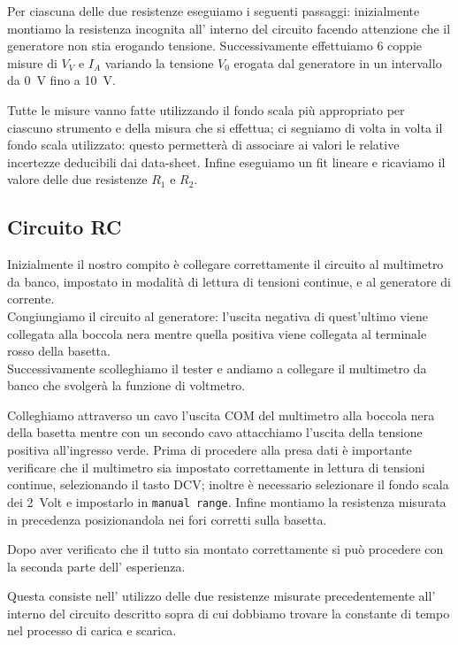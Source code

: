 \documentclass[italian, a4paper, 10pt, twocolumn]{../../style/lab_unige}
\begin{document}
    Per ciascuna delle due resistenze eseguiamo i seguenti passaggi: inizialmente montiamo la resistenza incognita  all’ interno del circuito facendo attenzione che il generatore non stia erogando tensione. Successivamente effettuiamo 6  coppie misure di $V_V$ e $I_A$ variando la tensione $V_0$ erogata dal generatore in un intervallo da 0~V fino a 10~V.  

    Tutte le misure vanno fatte utilizzando il fondo scala più appropriato per ciascuno strumento e della misura che si effettua; ci segniamo di volta in volta il fondo scala utilizzato: questo permetterà di associare ai valori le relative incertezze deducibili dai data-sheet. Infine eseguiamo un fit lineare e ricaviamo il valore delle due resistenze $R_1$ e $R_2$.

    \subsection{Circuito RC}

    Inizialmente il nostro compito è collegare correttamente il circuito al multimetro da banco, impostato in modalità di lettura di tensioni continue, e al generatore di corrente.\\
    Congiungiamo il circuito al generatore: l’uscita negativa di quest’ultimo viene collegata alla boccola nera mentre quella positiva viene collegata al terminale rosso della basetta.\\
    Successivamente scolleghiamo il tester e andiamo a collegare il multimetro da banco che svolgerà la funzione di voltmetro.

    Colleghiamo attraverso un cavo l’uscita COM del multimetro alla boccola nera della basetta mentre con un secondo cavo attacchiamo l’uscita della tensione positiva all’ingresso verde. Prima di procedere alla presa dati è importante verificare che il multimetro sia impostato correttamente in lettura di tensioni continue, selezionando il tasto DCV; inoltre è necessario selezionare il fondo scala dei 2~Volt e impostarlo in \verb|manual range|. Infine montiamo la resistenza misurata in precedenza posizionandola nei fori corretti sulla basetta.

    Dopo aver verificato che il tutto sia montato correttamente si può procedere con la seconda parte dell’ esperienza.

    Questa consiste nell’ utilizzo delle due resistenze misurate precedentemente all’ interno del circuito descritto sopra di cui dobbiamo trovare la constante di tempo nel processo di carica e scarica.
\end{document}
